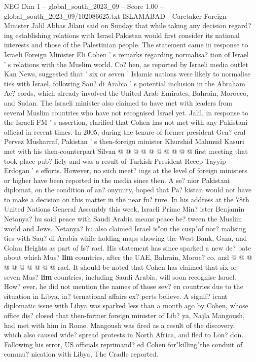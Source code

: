 \begin{textsample}{NEG Dim 1 – global\_south\_2023\_09 – Score 1.00 – global\_south\_2023\_09/102086625.txt}  \label{ex:f1_neg_022}
ISLAMABAD - Caretaker Foreign Minister Jalil Abbas Jilani said on Sunday that while taking any decision regard? ing establishing relations with Israel Pakistan would first consider its national interests and those of the Palestinian people.
The statement came in response to Israeli Foreign Minister Eli Cohen ' s remarks regarding normalisa? tion of Israel ' s relations with the Muslim world.
Co? hen, as reported by Israeli media outlet Kan News, suggested that ' six or seven ' Islamic nations were likely to normalise ties with Israel, following Sau? di Arabia ' s potential inclusion in the Abraham Ac? cords, which already involved the United Arab Emirates, Bahrain, Morocco, and Sudan.
The Israeli minister also claimed to have met with leaders from several Muslim countries who have not recognised Israel yet.
Jalil, in response to the Israeli FM ' s assertion, clarified that Cohen has not met with any Pakistani official in recent times.
In 2005, during the tenure of former president Gen? eral Pervez Musharraf, Pakistan ' s then-foreign minister Khurshid Mahmud Kasuri met with his then-counterpart Silvan @ @ @ @ @ @ @ @ @ @ first meeting that took place pub? licly and was a result of Turkish President Recep Tayyip Erdogan ' s efforts.
However, no such meet? ings at the level of foreign ministers or higher have been reported in the media since then.
A se? nior Pakistani diplomat, on the condition of an? onymity, hoped that Pa? kistan would not have to make a decision on this matter in the near fu? ture.
In his address at the 78th United Nations General Assembly this week, Israeli Prime Min? ister Benjamin Netanya? hu said peace with Saudi Arabia means peace be? tween the Muslim world and Jews.
Netanya? hu also claimed Israel is"on the cusp"of nor? malising ties with Sau? di Arabia while holding maps showing the West Bank, Gaza, and Golan Heights as part of Is? rael.
His statement has since sparked a new de? bate about which Mus? \textbf{lim} countries, after the UAE, Bahrain, Moroc? co, and @ @ @ @ @ @ @ @ @ @ rael.
It should be noted that Cohen has claimed that six or seven Mus? \textbf{lim} countries, including Saudi Arabia, will soon recognise Israel.
How? ever, he did not mention the names of those sev? en countries due to the situation in Libya, in? ternational affairs ex? perts believe.
A signif? icant diplomatic issue with Libya was sparked less than a month ago by Cohen, whose office dis? closed that then-former foreign minister of Lib? ya, Najla Mangoush, had met with him in Rome.
Mangoush was fired as a result of the discovery, which also caused wide? spread protests in North Africa, and fled to Lon? don.
Following his error, US officials reprimand? ed Cohen for"killing"the conduit of commu? nication with Libya, The Cradle reported.

\end{textsample}
